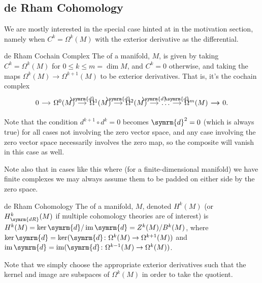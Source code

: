 \documentclass[fleqn]{NotesClass}
\renewcommand{\dl}{\symrm{d}}
\DeclareMathOperator{\im}{im}
\begin{document}
    \subsection{de Rham Cohomology}
    We are mostly interested in the special case hinted at in the motivation section, namely when \(C^k = \Omega^k(M)\) with the exterior derivative as the differential.
    
    \begin{dfn}{de Rham Cochain Complex}{}
        The  of a manifold, \(M\), is given by taking \(C^k = \Omega^k(M)\) for \(0 \le k \le m = \dim M\), and \(C^k = 0\) otherwise, and taking the maps \(\Omega^k(M) \to \Omega^{k+1}(M)\) to be exterior derivatives.
        That is, it's the cochain complex
        \begin{equation*}
            \begin{tikzcd}[column sep=small]
                0 \arrow[r] & \Omega^0(M) \arrow[r, "\dl"] & \Omega^1(M) \arrow[r, "\dl"] & \Omega^2(M) \arrow[r, "\dl"] & \dots \arrow[r, "\dl"] & \Omega^m(M) \arrow[r] \arrow[r] & 0.
            \end{tikzcd}
        \end{equation*}
    \end{dfn}
    
    Note that the condition \(d^{k+1} \circ d^k = 0\) becomes \(\dl^2 = 0\) (which is always true) for all cases not involving the zero vector space, and any case involving the zero vector space necessarily involves the zero map, so the composite will vanish in this case as well.
    
    Note also that in cases like this where (for a finite-dimensional manifold) we have finite complexes we may always assume them to be padded on either side by the zero space.
    
    \begin{dfn}{de Rham Cohomology}{}
        The  of a manifold, \(M\), denoted \(H^k(M)\) (or \(H^k_{\symrm{dR}}(M)\) if multiple cohomology theories are of interest) is \(H^k(M) = \ker \dl/\im \dl = Z^k(M)/B^k(M)\), where \(\ker \dl = \ker(\dl \colon \Omega^k(M) \to \Omega^{k + 1}(M))\) and \(\im \dl = \im (\dl \colon \Omega^{k-1}(M) \to \Omega^k(M))\).
    \end{dfn}
    
    Note that we simply choose the appropriate exterior derivatives such that the kernel and image are subspaces of \(\Omega^k(M)\) in order to take the quotient.
    
\end{document}
